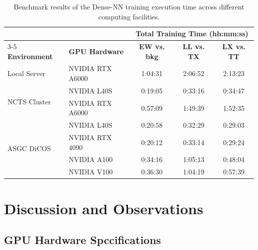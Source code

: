 \documentclass[12pt]{article}
\begin{document}
    \begin{table}[htbp]
        \centering
        \caption{Benchmark results of the Dense-NN training execution time across different computing facilities.}
        \label{tab:gpu_performance}
        \begin{tabular}{llccc}
        \toprule
                                      &                       & \multicolumn{3}{c}{\textbf{Total Training Time (hh:mm:ss)}}   \\ \cmidrule(lr){3-5} 
        \textbf{Environment}          & \textbf{GPU Hardware} & \textbf{EW vs. bkg} & \textbf{LL vs. TX} & \textbf{LX vs. TT} \\
        \midrule
        Local Server                  & NVIDIA RTX A6000      & 1:04:31             & 2:06:52            & 2:13:23            \\
        \midrule
        \multirow{2}{*}{NCTS Cluster} & NVIDIA L40S           & 0:19:05             & 0:33:16            & 0:34:47            \\
                                      & NVIDIA RTX A6000      & 0:57:09             & 1:49:39            & 1:52:35            \\
        \midrule
        \multirow{4}{*}{ASGC DiCOS}   & NVIDIA L40S           & 0:20:58             & 0:32:29            & 0:29:03            \\
                                      & NVIDIA RTX 4090       & 0:20:12             & 0:33:14            & 0:29:24            \\
                                      & NVIDIA A100           & 0:34:16             & 1:05:13            & 0:48:04            \\
                                      & NVIDIA V100           & 0:36:30             & 1:04:19            & 0:57:39            \\
        \bottomrule
        \end{tabular}
    \end{table}



\section{Discussion and Observations}%
\label{sec:discussion_and_observations}

    \subsection{GPU Hardware Spccifications}%
    \label{sub:gpu_hardware_spccifications}
\end{document}
